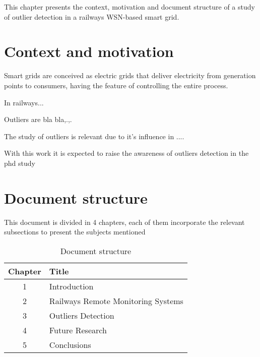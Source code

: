 This chapter presents the context, motivation and document structure of a study of outlier detection in a railways WSN-based smart grid. 

\section{Context and motivation}

Smart grids are conceived as electric grids that deliver electricity from generation points to consumers, having the feature of controlling the entire process.

In railways...

Outliers are bla bla,.,.

The study of outliers is relevant due to it's influence in ....

With this work it is expected to raise the awareness of outliers detection in the phd study




\section{Document structure}

This document is divided in 4 chapters, each of them incorporate the relevant subsections to present the subjects mentioned

\begin{table}[!h]
    \label{tb:struct}
    \centering
    \caption{Document structure}
    \vspace{0.2em}
    \begin{tabular}{c|l}%
    \textbf{Chapter} & \textbf{Title}                    \\ \hline
    1       &                   Introduction             \\ \hline
    2       &                   Railways Remote Monitoring Systems       \\ \hline
    3       &                   Outliers Detection    \\ \hline
    4       &                   Future Research    \\ \hline
    5       &                   Conclusions               \\
    \end{tabular}
\end{table}
